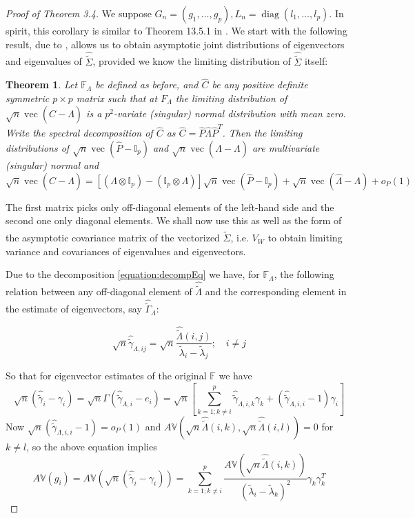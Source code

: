 \documentclass[ejs]{imsart}
\newcommand{\BF}{{\mathbb{F}}}
\newcommand{\BI}{{\mathbb{I}}}
\newcommand{\BV}{{\mathbb{V}}}
\DeclareMathOperator*{\ve}{vec}
\DeclareMathOperator*{\diag}{diag }
\newtheorem{Theorem}{Theorem}[section]
\theoremstyle{definition} \newtheorem{Definition}[Theorem]{Definition}
\begin{document}
\begin{proof}[Proof of Theorem 3.4]
We suppose $G_n = (g_1, \ldots, g_p), L_n = \diag(l_1, \ldots, l_p)$. In spirit, this corollary is similar to Theorem 13.5.1 in \cite{ref:AndersonBook09}. We start with the following result, due to \citep{ref:SPL12765_Taskinenetal}, allows us to obtain asymptotic joint distributions of eigenvectors and eigenvalues of $\hat{\tilde \Sigma}$, provided we know the limiting distribution of $\hat{\tilde \Sigma}$ itself:

\begin{Theorem} \label{Theorem:decomp} 
Let $\BF_\Lambda$ be defined as before, and $\hat C$ be any positive definite symmetric $p \times p$ matrix such that at $F_\Lambda$ the limiting distribution of $\sqrt n \ve(\hat C - \Lambda)$ is a $p^2$-variate (singular) normal distribution with mean zero. Write the spectral decomposition of $\hat C$ as $\hat C = \hat P \hat\Lambda \hat P^T$. Then the limiting distributions of $\sqrt n \ve(\hat P - \BI_p)$ and $\sqrt n \ve( \hat\Lambda - \Lambda)$ are multivariate (singular) normal and
%
\begin{equation} \label{equation:decompEq}
\sqrt n \ve (\hat C - \Lambda)  = \left[ (\Lambda \otimes \BI_p) - (\BI_p \otimes \Lambda) \right] \sqrt n \ve (\hat P - \BI_p) + \sqrt n \ve (\hat \Lambda - \Lambda) + o_P(1)
\end{equation}
\end{Theorem}

The first matrix picks only off-diagonal elements of the left-hand side and the second one only diagonal elements. We shall now use this as well as the form of the asymptotic covariance matrix of the vectorized $\hat {\tilde \Sigma}$, i.e. $V_W$ to obtain limiting variance and covariances of eigenvalues and eigenvectors.

Due to the decomposition \eqref{equation:decompEq} we have, for $\BF_\Lambda$, the following relation between any off-diagonal element of $\hat{\tilde \Lambda}$ and the corresponding element in the estimate of eigenvectors, say $\hat {\tilde \Gamma}_\Lambda$:

$$ \sqrt n \hat {\tilde \gamma}_{\Lambda, ij} = \sqrt n \frac{\hat {\tilde \Lambda} (i,j) }{\tilde \lambda_i - \tilde \lambda_j}; \quad i \neq j$$

So that for eigenvector estimates of the original $\BF$ we have
%
\begin{equation}\label{equation:app1}
\sqrt n ( \hat{\tilde \gamma}_{i} - \gamma_i) =
\sqrt n \Gamma ( \hat {\tilde \gamma}_{\Lambda, i} - e_i ) =
\sqrt n \left[ \sum_{k=1; k \neq i}^p \hat {\tilde \gamma}_{\Lambda,i,k} \gamma_k + (\hat {\tilde \gamma}_{\Lambda,i,i} - 1) \gamma_i \right]
\end{equation}
%
Now $\sqrt n (\hat {\tilde \gamma}_{\Lambda,i,i} - 1) =  o_P(1)$ and $A\BV(\sqrt n \hat {\tilde \Lambda} (i,k), \sqrt n \hat {\tilde \Lambda} (i,l) ) = 0$ for $k \neq l$, so the above equation implies
%
$$ A\BV(g_i) = A \BV (\sqrt n ( \hat{\tilde \gamma}_{i} - \gamma_i)) = \sum_{k=1; k \neq i}^p \frac{A\BV(\sqrt n \hat {\tilde \Lambda} (i,k))}{(\tilde \lambda_i - \tilde \lambda_k)^2} \gamma_k \gamma_k^T $$
%


\end{proof}
\end{document}
